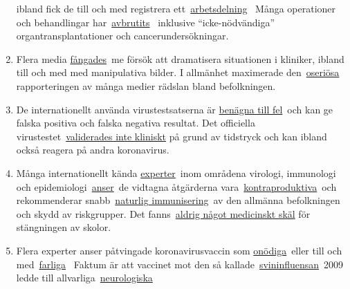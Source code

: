 \begin{enumerate}
  ibland fick de till och med registrera
  ett~\href{https://www.20min.ch/schweiz/news/story/Spitaeler-28949526}{arbetsdelning}~
  Många operationer och behandlingar
  har~\href{https://www.zeit.de/2020/18/kliniken-coronavirus-intensivbetten-patienten-behandlung-notaufnahme}{avbrutits}~
  inklusive ``icke-nödvändiga'' organtransplantationer och
  cancerundersökningar.
\item
  Flera media
  \href{https://nypost.com/2020/04/01/cbs-admits-to-using-footage-from-italy-in-report-about-nyc/}{fångades}~me
  försök att dramatisera situationen i kliniker, ibland till och med med
  manipulativa bilder. I allmänhet maximerade
  den~\href{https://www.infosperber.ch/Artikel/Medien/Corona-Medien-verbreiten-weiter-unbeirrt-statistischen-Unsinn}{oseriösa}
  rapporteringen av många medier rädslan bland befolkningen.
\item
  De internationellt använda virustestsatserna är
  \href{https://www.ncbi.nlm.nih.gov/pubmed/32219885}{benägna till
  fel}~och kan ge falska positiva och falska negativa resultat. Det
  officiella
  virustestet~\href{https://www.youtube.com/watch?v=p_AyuhbnPOI}{validerades
  inte kliniskt} på grund av tidstryck och kan ibland också reagera på
  andra koronavirus.
\item
  Många internationellt kända
  \href{https://www.rubikon.news/artikel/120-expertenstimmen-zu-corona}{experter}~inom
  områdena virologi, immunologi och
  epidemiologi~\href{https://off-guardian.org/2020/03/24/12-experts-questioning-the-coronavirus-panic/}{anser}~de
  vidtagna åtgärderna
  vara~\href{https://off-guardian.org/2020/03/28/10-more-experts-criticising-the-coronavirus-panic/}{kontraproduktiva}~och
  rekommenderar
  snabb~\href{https://off-guardian.org/2020/04/17/8-more-experts-questioning-the-coronavirus-panic/}{naturlig
  immunisering}~av den allmänna befolkningen och skydd av riskgrupper.
  Det
  fanns~\href{https://infekt.ch/2020/04/schulen-schliessen-hilfreich-oder-nicht/}{aldrig
  något medicinskt skäl} för stängningen av skolor.
\item
  Flera experter anser påtvingade koronavirusvaccin som
  \href{https://www.youtube.com/watch?v=vrL9QKGQrWk}{onödiga}~eller till
  och
  med~\href{https://www.nature.com/articles/d41586-020-00751-9}{farliga}~
  Faktum är att vaccinet mot den så
  kallade~\href{https://www.forbes.com/2010/02/05/world-health-organization-swine-flu-pandemic-opinions-contributors-michael-fumento.html}{svininfluensan}~2009
  ledde till
  allvarliga~\href{https://www.ibtimes.co.uk/brain-damaged-uk-victims-swine-flu-vaccine-get-60-million-compensation-1438572}{neurologiska
}
\end{enumerate}
